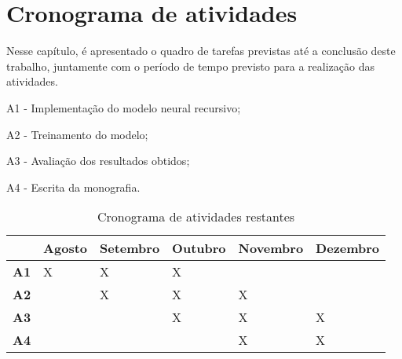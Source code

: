 \chapter{Cronograma de atividades}\label{cronograma}

Nesse capítulo, é apresentado o quadro de tarefas previstas até a conclusão deste
trabalho, juntamente com o período de tempo previsto para a realização das atividades.

A1 - Implementação do modelo neural recursivo;

A2 - Treinamento do modelo;

A3 - Avaliação dos resultados obtidos;

A4 - Escrita da monografia.

\begin{table}[!htb]
\footnotesize
\centering
\caption{Cronograma de atividades restantes}
\label{tab:cronogramaativs}
\begin{tabular}{P{1cm}P{2cm}P{2cm}P{2cm}P{2cm}P{2cm}}
  \toprule
  & \textbf{Agosto} & \textbf{Setembro}  & \textbf{Outubro}  & \textbf{Novembro} & \textbf{Dezembro}  \\
  \midrule
  \textbf{A1} & X & X & X &   &   \\
  \textbf{A2} &   & X & X & X &   \\
  \textbf{A3} &   &   & X & X & X \\
  \textbf{A4} &   &   &   & X & X \\
  \bottomrule
\end{tabular}
\end{table}
